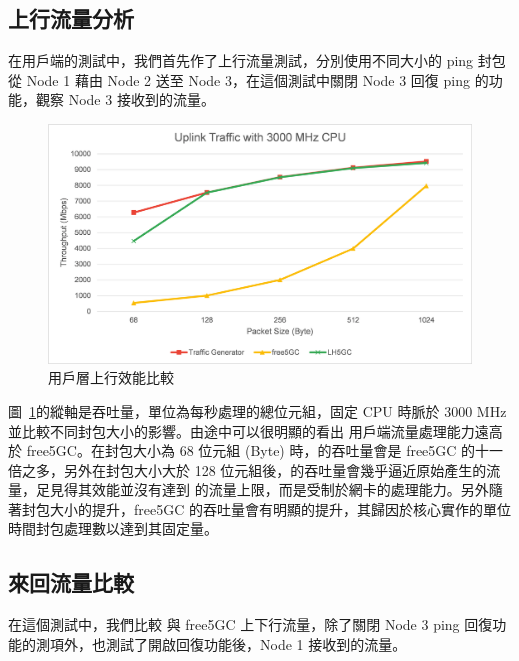 \subsection{上行流量分析}
\label{subsec:uplink_evaluation}

在用戶端的測試中，我們首先作了上行流量測試，分別使用不同大小的 ping 封包從 Node 1 藉由 Node 2 送至 Node 3，在這個測試中關閉 Node 3 回復 ping 的功能，觀察 Node 3 接收到的流量。

\begin{figure}[htb]
    \centering
    \includegraphics[height=!,width=0.8\linewidth,keepaspectratio=true]{figures/up_eva_pkt_size}
    \caption[用戶層上行效能比較]{{\footnotesize 用戶層上行效能比較}}
    \label{fig:up_eva_pkt_size}
\end{figure}

圖~\ref{fig:up_eva_pkt_size}的縱軸是吞吐量，單位為每秒處理的總位元組，固定 CPU 時脈於 3000 MHz 並比較不同封包大小的影響。由途中可以很明顯的看出 \LHCN 用戶端流量處理能力遠高於 free5GC。在封包大小為 68 位元組 (Byte) 時，\LHCN 的吞吐量會是 free5GC 的十一倍之多，另外在封包大小大於 128 位元組後，\LHCN 的吞吐量會幾乎逼近原始產生的流量，足見得其效能並沒有達到 \LHCN 的流量上限，而是受制於網卡的處理能力。另外隨著封包大小的提升，free5GC 的吞吐量會有明顯的提升，其歸因於核心實作的單位時間封包處理數以達到其固定量。

\subsection{來回流量比較}
\label{subsec:uldl_comp}

在這個測試中，我們比較 \LHCN 與 free5GC 上下行流量，除了關閉 Node 3 ping 回復功能的測項外，也測試了開啟回復功能後，Node 1 接收到的流量。

